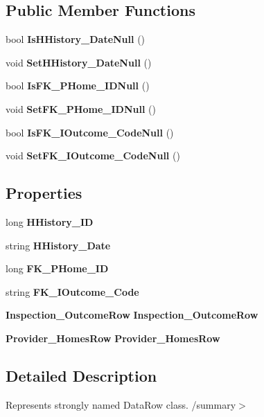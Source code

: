 \subsection*{Public Member Functions}
\begin{DoxyCompactItemize}
\item 
bool \textbf{ Is\+H\+History\+\_\+\+Date\+Null} ()
\item 
void \textbf{ Set\+H\+History\+\_\+\+Date\+Null} ()
\item 
bool \textbf{ Is\+F\+K\+\_\+\+P\+Home\+\_\+\+I\+D\+Null} ()
\item 
void \textbf{ Set\+F\+K\+\_\+\+P\+Home\+\_\+\+I\+D\+Null} ()
\item 
bool \textbf{ Is\+F\+K\+\_\+\+I\+Outcome\+\_\+\+Code\+Null} ()
\item 
void \textbf{ Set\+F\+K\+\_\+\+I\+Outcome\+\_\+\+Code\+Null} ()
\end{DoxyCompactItemize}
\subsection*{Properties}
\begin{DoxyCompactItemize}
\item 
long \textbf{ H\+History\+\_\+\+ID}\hspace{0.3cm}{\ttfamily  [get, set]}
\item 
string \textbf{ H\+History\+\_\+\+Date}\hspace{0.3cm}{\ttfamily  [get, set]}
\item 
long \textbf{ F\+K\+\_\+\+P\+Home\+\_\+\+ID}\hspace{0.3cm}{\ttfamily  [get, set]}
\item 
string \textbf{ F\+K\+\_\+\+I\+Outcome\+\_\+\+Code}\hspace{0.3cm}{\ttfamily  [get, set]}
\item 
\textbf{ Inspection\+\_\+\+Outcome\+Row} \textbf{ Inspection\+\_\+\+Outcome\+Row}\hspace{0.3cm}{\ttfamily  [get, set]}
\item 
\textbf{ Provider\+\_\+\+Homes\+Row} \textbf{ Provider\+\_\+\+Homes\+Row}\hspace{0.3cm}{\ttfamily  [get, set]}
\end{DoxyCompactItemize}


\subsection{Detailed Description}
Represents strongly named Data\+Row class. /summary$>$ 

